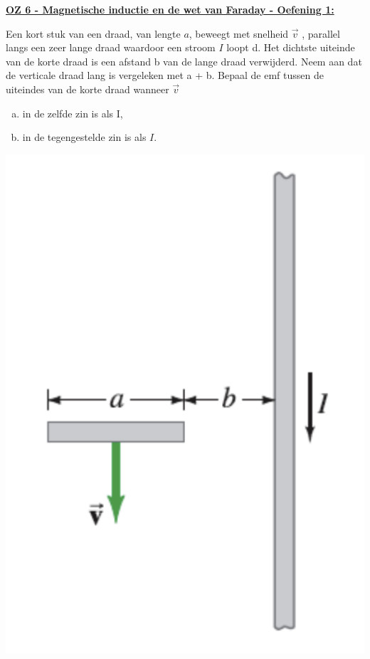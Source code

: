 \textbf{\underline{OZ 6 - Magnetische inductie en de wet van Faraday - Oefening 1:}}
\vspace{0.5cm}

    \begin{minipage}{.8\textwidth}
        Een kort stuk van een draad, van lengte $a$, beweegt met snelheid $\vec{v}$ , parallel langs
        een zeer lange draad waardoor een stroom $I$ loopt d. Het dichtste uiteinde
        van de korte draad is een afstand b van de lange draad verwijderd. Neem aan dat de
        verticale draad lang is vergeleken met a + b. Bepaal de emf tussen de uiteindes van
        de korte draad wanneer $\vec{v}$ 

        \begin{enumerate}[(a)]
            \item in de zelfde zin is als I,
            \item in de tegengestelde zin is als $I$.
        \end{enumerate}

    \end{minipage}
    \hspace{0.5cm}\begin{minipage}{.16\textwidth}
        \includegraphics[scale = 0.28]{oz06/resources/Oz6Oef1.png}
    \end{minipage}

